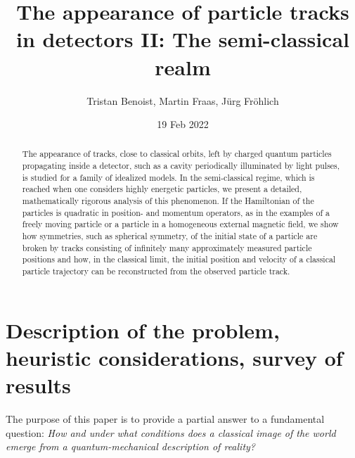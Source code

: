 \documentclass[12pt]{article}
\author{Tristan Benoist, Martin Fraas, J\"urg Fr\"ohlich}
\title{The appearance of particle tracks in detectors II:
The semi-classical realm}
\date{19 Feb 2022}
\begin{document}
\maketitle

\vspace{1em}

\begin{abstract}
The appearance of tracks, close to classical orbits, left by charged quantum particles propagating 
inside a detector, such as a cavity periodically illuminated by light pulses, is studied for a family of idealized models. 
In the semi-classical regime, which is reached when one considers highly energetic particles, we present a
detailed, mathematically rigorous analysis of this phenomenon. 
If the Hamiltonian of the particles is quadratic in position- and momentum operators, as in the examples 
of a freely moving particle or a particle in a homogeneous external magnetic field, we show how symmetries, 
such as spherical symmetry, of the initial state of a particle are broken by tracks consisting of infinitely 
many approximately measured particle positions and how, in the classical limit, the initial position and 
velocity of a classical particle trajectory can be reconstructed from the observed particle track.
\end{abstract}

\section{Description of the problem, heuristic considerations, survey of results}\label{Intro}


The purpose of this paper is to provide a partial answer to a fundamental question: \textit{How and under 
what conditions does a classical image of the world emerge from a quantum-mechanical description of reality?} 
\end{document}
